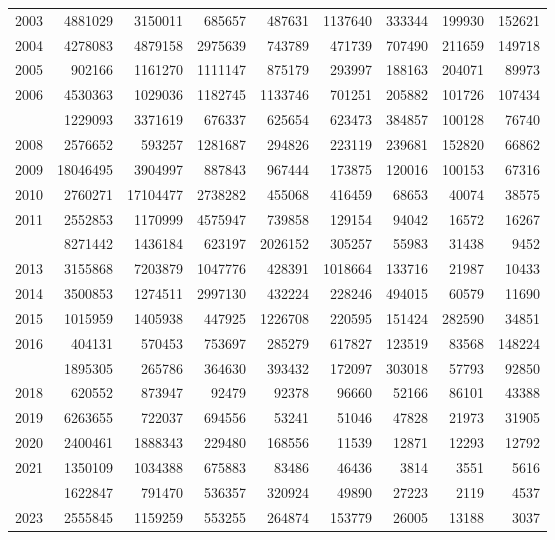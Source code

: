 \documentclass[
]{article}
\begin{document}
\begin{longtable}[t]{lrrrrrrrr}
2003 & 4881029 & 3150011 & 685657 & 487631 & 1137640 & 333344 & 199930 & 152621\\
2004 & 4278083 & 4879158 & 2975639 & 743789 & 471739 & 707490 & 211659 & 149718\\
2005 & 902166 & 1161270 & 1111147 & 875179 & 293997 & 188163 & 204071 & 89973\\
2006 & 4530363 & 1029036 & 1182745 & 1133746 & 701251 & 205882 & 101726 & 107434\\
\addlinespace
2007 & 1229093 & 3371619 & 676337 & 625654 & 623473 & 384857 & 100128 & 76740\\
2008 & 2576652 & 593257 & 1281687 & 294826 & 223119 & 239681 & 152820 & 66862\\
2009 & 18046495 & 3904997 & 887843 & 967444 & 173875 & 120016 & 100153 & 67316\\
2010 & 2760271 & 17104477 & 2738282 & 455068 & 416459 & 68653 & 40074 & 38575\\
2011 & 2552853 & 1170999 & 4575947 & 739858 & 129154 & 94042 & 16572 & 16267\\
\addlinespace
2012 & 8271442 & 1436184 & 623197 & 2026152 & 305257 & 55983 & 31438 & 9452\\
2013 & 3155868 & 7203879 & 1047776 & 428391 & 1018664 & 133716 & 21987 & 10433\\
2014 & 3500853 & 1274511 & 2997130 & 432224 & 228246 & 494015 & 60579 & 11690\\
2015 & 1015959 & 1405938 & 447925 & 1226708 & 220595 & 151424 & 282590 & 34851\\
2016 & 404131 & 570453 & 753697 & 285279 & 617827 & 123519 & 83568 & 148224\\
\addlinespace
2017 & 1895305 & 265786 & 364630 & 393432 & 172097 & 303018 & 57793 & 92850\\
2018 & 620552 & 873947 & 92479 & 92378 & 96660 & 52166 & 86101 & 43388\\
2019 & 6263655 & 722037 & 694556 & 53241 & 51046 & 47828 & 21973 & 31905\\
2020 & 2400461 & 1888343 & 229480 & 168556 & 11539 & 12871 & 12293 & 12792\\
2021 & 1350109 & 1034388 & 675883 & 83486 & 46436 & 3814 & 3551 & 5616\\
\addlinespace
2022 & 1622847 & 791470 & 536357 & 320924 & 49890 & 27223 & 2119 & 4537\\
2023 & 2555845 & 1159259 & 553255 & 264874 & 153779 & 26005 & 13188 & 3037\\*
\end{longtable}
\end{document}
